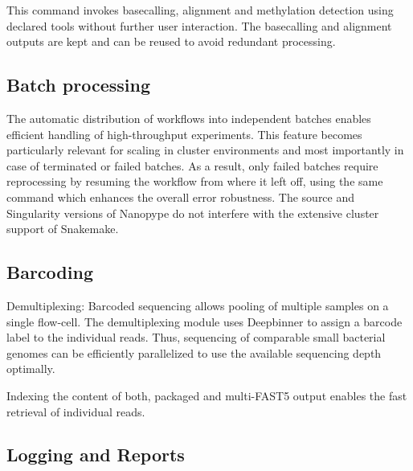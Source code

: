 This command invokes basecalling, alignment and methylation detection using declared tools without further user interaction. The basecalling and alignment outputs are kept and can be reused to avoid redundant processing.



\subsection{Batch processing}
The automatic distribution of workflows into independent batches enables efficient handling of high-throughput experiments. This feature becomes particularly relevant for scaling in cluster environments and most importantly in case of terminated or failed batches. As a result, only failed batches require reprocessing by resuming the workflow from where it left off, using the same command which enhances the overall error robustness.
The source and Singularity versions of Nanopype do not interfere with the extensive cluster support of Snakemake.



\subsection{Barcoding}
Demultiplexing: Barcoded sequencing allows pooling of multiple samples on a single flow-cell. The demultiplexing module uses Deepbinner \cite{Wick2018} to assign a barcode label to the individual reads. Thus, sequencing of comparable small bacterial genomes can be efficiently parallelized to use the available sequencing depth optimally.

Indexing the content of both, packaged and multi-FAST5 output enables the fast retrieval of individual reads. 


\subsection{Logging and Reports}

